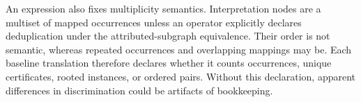 An expression also fixes multiplicity semantics. Interpretation nodes are a
multiset of mapped occurrences unless an operator explicitly declares
deduplication under the attributed-subgraph equivalence. Their order is not
semantic, whereas repeated occurrences and overlapping mappings may be. Each
baseline translation therefore declares whether it counts occurrences, unique
certificates, rooted instances, or ordered pairs. Without this declaration,
apparent differences in discrimination could be artifacts of bookkeeping.
